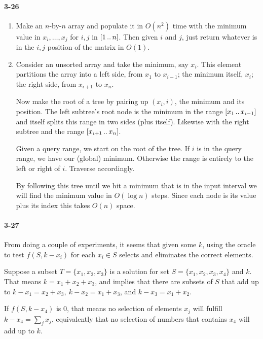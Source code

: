 \documentclass{report}
\newcommand{\ldotsTwo}{%
 \mathinner{{\ldotp}{\ldotp}}%
}
\begin{document}
\paragraph{3-26}
\begin{enumerate}[label=\alph*)]
	\item Make an $n$-by-$n$ array and populate it in $O(n^2)$ time with the minimum value in $x_i,\ldots,x_j$ for $i,j$ in $[1\ldotsTwo n]$. Then given $i$ and $j$, just return whatever is in the $i,j$ position of the matrix in $O(1)$.
	\item Consider an unsorted array and take the minimum, say $x_i$. This element partitions the array into a left side, from $x_1$ to $x_{i-1}$; the minimum itself, $x_i$; the right side, from $x_{i+1}$ to $x_n$.

	Now make the root of a tree by pairing up $(x_i, i)$, the minimum and its position. The left subtree's root node is the minimum in the range $[x_1\ldotsTwo x_{i-1}]$ and itself splits this range in two sides (plus itself). Likewise with the right subtree and the range $[x_{i+1}\ldotsTwo x_n]$.

	Given a query range, we start on the root of the tree. If $i$ is in the query range, we have our (global) minimum. Otherwise the range is entirely to the left or right of $i$. Traverse accordingly.

	By following this tree until we hit a minimum that is in the input interval we will find the minimum value in $O(\log n)$ steps. Since each node is its value plus its index this takes $O(n)$ space.
\end{enumerate}

\paragraph{3-27} From doing a couple of experiments, it seems that given some $k$, using the oracle to test $f(S, k-x_i)$ for each $x_i\in S$ selects and eliminates the correct elements.

Suppose a subset $T=\{x_1, x_2, x_3\}$ is a solution for set $S=\{x_1, x_2, x_3, x_4\}$ and $k$. That means $k = x_1+x_2+x_3$, and implies that there are subsets of $S$ that add up to $k-x_1=x_2+x_3,\ k-x_2=x_1+x_3$, and $k-x_3=x_1+x_2$.

If $f(S, k-x_4)$ is 0, that means no selection of elements $x_j$ will fulfill $k-x_4=\sum_j x_j$, equivalently that no selection of numbers that contains $x_4$ will add up to $k$.
\end{document}
